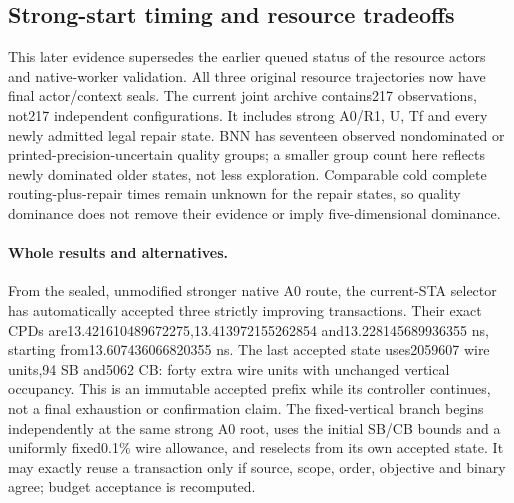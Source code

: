 \subsection{Strong-start timing and resource tradeoffs}
This later evidence supersedes the earlier queued status of the resource actors and native-worker validation. All three original resource trajectories now have final actor/context seals. The current joint archive contains217 observations, not217 independent configurations. It includes strong A0/R1, U, Tf and every newly admitted legal repair state. BNN has seventeen observed nondominated or printed-precision-uncertain quality groups; a smaller group count here reflects newly dominated older states, not less exploration. Comparable cold complete routing-plus-repair times remain unknown for the repair states, so quality dominance does not remove their evidence or imply five-dimensional dominance.

\paragraph{Whole results and alternatives.}
From the sealed, unmodified stronger native A0 route, the current-STA selector has automatically accepted three strictly improving transactions. Their exact CPDs are13.421610489672275,13.413972155262854 and13.228145689936355 ns, starting from13.607436066820355 ns. The last accepted state uses2059607 wire units,94 SB and5062 CB: forty extra wire units with unchanged vertical occupancy. This is an immutable accepted prefix while its controller continues, not a final exhaustion or confirmation claim. The fixed-vertical branch begins independently at the same strong A0 root, uses the initial SB/CB bounds and a uniformly fixed0.1\% wire allowance, and reselects from its own accepted state. It may exactly reuse a transaction only if source, scope, order, objective and binary agree; budget acceptance is recomputed.

